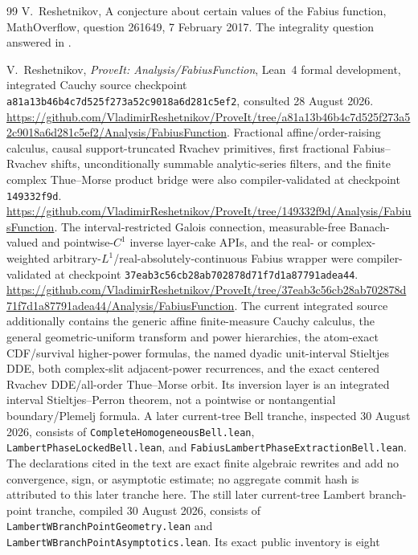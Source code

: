 \documentclass[11pt,oneside]{article}
\theoremstyle{definition}
\theoremstyle{remark}
\begin{document}
\begin{thebibliography}{99}
V.~Reshetnikov,
\newblock A conjecture about certain values of the Fabius function,
\newblock MathOverflow, question 261649, 7 February 2017.
\newblock The integrality question answered in \cite{arias2018}.

V.~Reshetnikov,
\newblock \emph{ProveIt: Analysis/FabiusFunction},
\newblock Lean~4 formal development, integrated Cauchy source checkpoint
\texttt{a81a13b46b4c7d525f273a52c9018a6d281c5ef2}, consulted 28 August 2026.
\newblock \url{https://github.com/VladimirReshetnikov/ProveIt/tree/a81a13b46b4c7d525f273a52c9018a6d281c5ef2/Analysis/FabiusFunction}.
\newblock Fractional affine/order-raising calculus, causal support-truncated Rvachev
primitives, first fractional Fabius--Rvachev shifts, unconditionally summable
analytic-series filters, and the finite complex
Thue--Morse product bridge were also compiler-validated at checkpoint
\texttt{149332f9d}.
\newblock \url{https://github.com/VladimirReshetnikov/ProveIt/tree/149332f9d/Analysis/FabiusFunction}.
\newblock The interval-restricted Galois connection, measurable-free Banach-valued and
pointwise-$C^1$ inverse layer-cake APIs, and the real- or complex-weighted
arbitrary-$L^1$/real-absolutely-continuous Fabius wrapper were compiler-validated at
checkpoint \texttt{37eab3c56cb28ab702878d71f7d1a87791adea44}.
\newblock \url{https://github.com/VladimirReshetnikov/ProveIt/tree/37eab3c56cb28ab702878d71f7d1a87791adea44/Analysis/FabiusFunction}.
\newblock The current integrated source additionally contains the generic affine
finite-measure Cauchy calculus, the general geometric-uniform transform and power
hierarchies, the atom-exact CDF/survival higher-power formulas, the named dyadic
unit-interval Stieltjes DDE, both complex-slit adjacent-power recurrences, and the exact
centered Rvachev DDE/all-order Thue--Morse orbit.  Its inversion layer is an integrated
interval Stieltjes--Perron theorem, not a pointwise or nontangential boundary/Plemelj
formula.
\newblock A later current-tree Bell tranche, inspected 30 August 2026, consists of
\texttt{CompleteHomogeneousBell.lean}, \texttt{LambertPhaseLockedBell.lean}, and
\texttt{FabiusLambertPhaseExtractionBell.lean}.  The declarations cited in the text
are exact finite algebraic rewrites and add no convergence, sign, or asymptotic
estimate; no aggregate commit hash is attributed to this later tranche here.
\newblock The still later current-tree Lambert branch-point tranche, compiled
30 August 2026, consists of \texttt{LambertWBranchPointGeometry.lean} and
\texttt{LambertWBranchPointAsymptotics.lean}.  Its exact public inventory is eight

\end{thebibliography}
\end{document}
